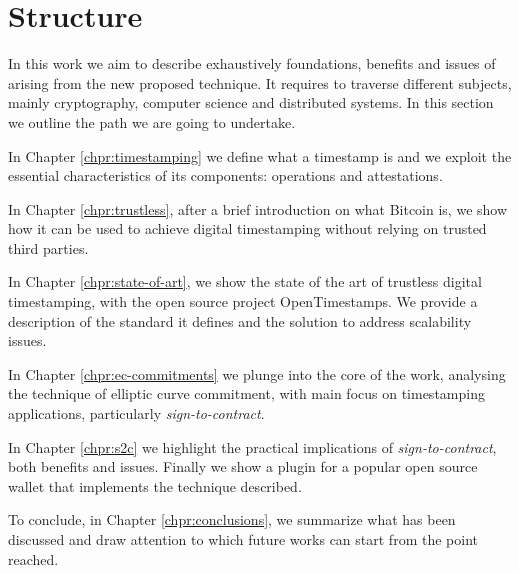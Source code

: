 \section{Structure}
In this work we aim to describe exhaustively foundations, benefits and issues of arising from the new proposed technique. 
It requires to traverse different subjects, mainly cryptography, computer science and distributed systems.
In this section we outline the path we are going to undertake.

In Chapter \ref{chpr:timestamping} we define what a timestamp is and we exploit the essential characteristics of its components: operations and attestations.

In Chapter \ref{chpr:trustless}, after a brief introduction on what Bitcoin is, we show how it can be used to achieve digital timestamping without relying on trusted third parties.

In Chapter \ref{chpr:state-of-art}, we show the state of the art of trustless digital timestamping, with the open source project OpenTimestamps. 
We provide a description of the standard it defines and the solution to address scalability issues.

In Chapter \ref{chpr:ec-commitments} we plunge into the core of the work, analysing the technique of elliptic curve commitment, with main focus on timestamping applications, particularly \textit{sign-to-contract}.

In Chapter \ref{chpr:s2c} we highlight the practical implications of \textit{sign-to-contract}, both benefits and issues. Finally we show a plugin for a popular open source wallet that implements the technique described.

To conclude, in Chapter \ref{chpr:conclusions}, we summarize what has been discussed and draw attention to which future works can start from the point reached.